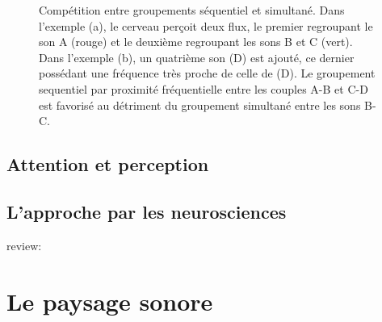 \begin{figure}[bth]
        \myfloatalign
        \caption[Compétition entre groupements séquentiel et simultané]{Compétition entre groupements séquentiel et simultané. Dans l'exemple (a), le cerveau perçoit deux flux, le premier regroupant le son A (rouge) et le deuxième regroupant les sons B et C (vert). Dans l'exemple (b), un quatrième son (D) est ajouté, ce dernier possédant une fréquence très proche de celle de (D). Le groupement sequentiel par proximité fréquentielle entre les couples A-B et C-D est favorisé au détriment du groupement simultané entre les sons B-C.}\label{fig:simvsseq}
\end{figure}

\subsection{Attention et perception}

\subsection{L'approche par les neurosciences}

review: \citep{snyder2007toward}

\section{Le paysage sonore}
\label{sec:paysageSonore}

